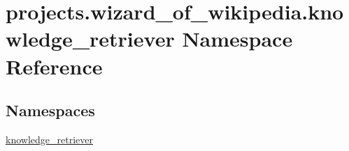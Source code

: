 \hypertarget{namespaceprojects_1_1wizard__of__wikipedia_1_1knowledge__retriever}{}\section{projects.\+wizard\+\_\+of\+\_\+wikipedia.\+knowledge\+\_\+retriever Namespace Reference}
\label{namespaceprojects_1_1wizard__of__wikipedia_1_1knowledge__retriever}
\subsection*{Namespaces}
\begin{DoxyCompactItemize}
\item 
 \hyperlink{namespaceprojects_1_1wizard__of__wikipedia_1_1knowledge__retriever_1_1knowledge__retriever}{knowledge\+\_\+retriever}
\end{DoxyCompactItemize}
